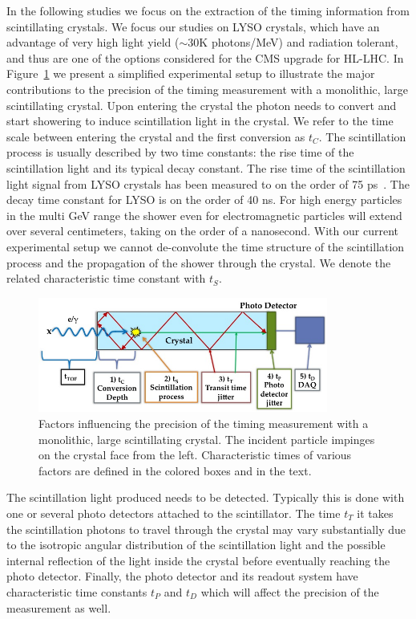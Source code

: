 \documentclass[11pt]{article}
\begin{document}
In the following studies we focus on the extraction of the timing information
from scintillating crystals. We focus our studies on LYSO crystals, which have
an advantage of very high light yield ($\sim 30$K photons/MeV) and radiation
tolerant, and thus are one of the options considered for the CMS upgrade for
HL-LHC. In Figure~\ref{fig:ScintillatorTiming} we present a simplified
experimental setup to illustrate the major contributions to the precision of the
timing measurement with a monolithic, large scintillating crystal. Upon entering
the crystal the photon  needs to convert and start showering to induce
scintillation light in the crystal. We refer to the time scale between entering the crystal
and the first conversion as $t_C$. The
scintillation process is usually described by two time constants: the rise time
of the scintillation light and its typical decay constant. The rise time of the
scintillation light signal from LYSO crystals has been measured to on the order
of 75 ps~\cite{LYSOrisetime}. The decay time constant for LYSO is on the order
of 40 ns. For high energy particles in the multi GeV range the shower even for
electromagnetic particles will extend over several centimeters, taking on the
order of a nanosecond. With our current experimental setup we cannot
de-convolute the time structure of the scintillation process and the propagation
of the shower through the crystal. We denote the related characteristic time
constant with $t_S$. 

\begin{figure}[h] \centering
\includegraphics[width=0.85\textwidth]{figs/ScintillatorTiming} \caption{Factors
influencing the precision of the timing measurement with a monolithic, large
scintillating crystal. The incident particle impinges on the crystal face from
the left. Characteristic times of various factors are defined in the colored
boxes and in the text.}
\label{fig:ScintillatorTiming}
\end{figure}

The scintillation light produced needs to be detected. Typically this is done
with one or several photo detectors attached to the scintillator. The time $t_T$
it takes the scintillation photons to travel through the crystal may vary
substantially due to the isotropic angular distribution of the scintillation
light and the possible internal reflection of the light inside the crystal
before eventually reaching the photo detector. Finally, the photo detector and
its readout system have characteristic time constants $t_P$ and $t_D$ which will
affect the precision of the measurement as well.
\end{document}
